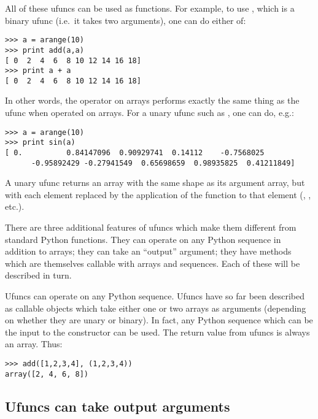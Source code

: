 
All of these ufuncs can be used as functions. For example, to use
, which is a binary ufunc (i.e.\ it takes two arguments), one can
do either of:
\begin{verbatim}
>>> a = arange(10)
>>> print add(a,a)
[ 0  2  4  6  8 10 12 14 16 18]
>>> print a + a
[ 0  2  4  6  8 10 12 14 16 18]
\end{verbatim}
In other words, the \code{+} operator on arrays performs exactly the same thing
as the  ufunc when operated on arrays.  For a unary ufunc such as
, one can do, e.g.:
\begin{verbatim}
>>> a = arange(10)
>>> print sin(a)
[ 0.          0.84147096  0.90929741  0.14112    -0.7568025
      -0.95892429 -0.27941549  0.65698659  0.98935825  0.41211849]
\end{verbatim}
A unary ufunc returns an array with the same shape as its argument array, but
with each element replaced by the application of the function to that element
(, , etc.).

There are three additional features of ufuncs which make them different from
standard Python functions. They can operate on any Python sequence in addition
to arrays; they can take an ``output'' argument; they have methods which are
themselves callable with arrays and sequences. Each of these will be described
in turn.

Ufuncs can operate on any Python sequence. Ufuncs have so far been described as
callable objects which take either one or two arrays as arguments (depending on
whether they are unary or binary). In fact, any Python sequence which can be
the input to the  constructor can be used.  The return value
from ufuncs is always an array.  Thus:
\begin{verbatim}
>>> add([1,2,3,4], (1,2,3,4))
array([2, 4, 6, 8])
\end{verbatim}


\subsection{Ufuncs can take output arguments}
\label{sec:ufuncs-can-take}

